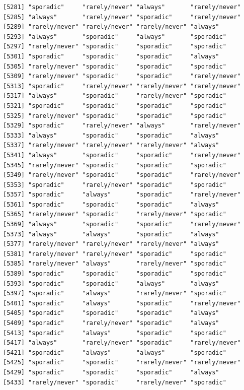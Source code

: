 \documentclass[
  letterpaper,
  DIV=11,
  numbers=noendperiod]{scrartcl}
\begin{document}
\begin{verbatim}
[5281] "sporadic"     "rarely/never" "always"       "rarely/never"
[5285] "always"       "rarely/never" "sporadic"     "rarely/never"
[5289] "rarely/never" "rarely/never" "rarely/never" "always"      
[5293] "always"       "sporadic"     "always"       "sporadic"    
[5297] "rarely/never" "sporadic"     "sporadic"     "sporadic"    
[5301] "sporadic"     "sporadic"     "sporadic"     "always"      
[5305] "rarely/never" "sporadic"     "sporadic"     "sporadic"    
[5309] "rarely/never" "sporadic"     "sporadic"     "rarely/never"
[5313] "sporadic"     "rarely/never" "rarely/never" "rarely/never"
[5317] "always"       "sporadic"     "rarely/never" "sporadic"    
[5321] "sporadic"     "sporadic"     "sporadic"     "sporadic"    
[5325] "rarely/never" "sporadic"     "sporadic"     "sporadic"    
[5329] "sporadic"     "rarely/never" "always"       "rarely/never"
[5333] "always"       "sporadic"     "sporadic"     "always"      
[5337] "rarely/never" "rarely/never" "rarely/never" "always"      
[5341] "always"       "sporadic"     "sporadic"     "rarely/never"
[5345] "rarely/never" "sporadic"     "sporadic"     "sporadic"    
[5349] "rarely/never" "sporadic"     "sporadic"     "rarely/never"
[5353] "sporadic"     "rarely/never" "sporadic"     "sporadic"    
[5357] "sporadic"     "always"       "sporadic"     "rarely/never"
[5361] "sporadic"     "sporadic"     "sporadic"     "always"      
[5365] "rarely/never" "sporadic"     "rarely/never" "sporadic"    
[5369] "always"       "sporadic"     "sporadic"     "rarely/never"
[5373] "always"       "always"       "sporadic"     "always"      
[5377] "rarely/never" "rarely/never" "rarely/never" "always"      
[5381] "rarely/never" "rarely/never" "sporadic"     "sporadic"    
[5385] "rarely/never" "always"       "rarely/never" "sporadic"    
[5389] "sporadic"     "sporadic"     "sporadic"     "sporadic"    
[5393] "sporadic"     "sporadic"     "always"       "always"      
[5397] "sporadic"     "always"       "rarely/never" "sporadic"    
[5401] "sporadic"     "always"       "sporadic"     "rarely/never"
[5405] "sporadic"     "sporadic"     "sporadic"     "always"      
[5409] "sporadic"     "rarely/never" "sporadic"     "always"      
[5413] "sporadic"     "always"       "sporadic"     "sporadic"    
[5417] "always"       "rarely/never" "sporadic"     "rarely/never"
[5421] "sporadic"     "always"       "always"       "sporadic"    
[5425] "sporadic"     "sporadic"     "rarely/never" "rarely/never"
[5429] "sporadic"     "sporadic"     "sporadic"     "always"      
[5433] "rarely/never" "sporadic"     "rarely/never" "sporadic"    

\end{verbatim}
\end{document}
